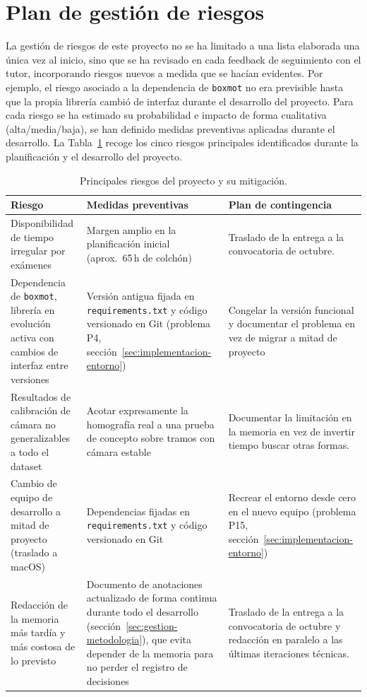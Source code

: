 \section{Plan de gestión de riesgos}
\label{sec:gestion-riesgos}

La gestión de riesgos de este proyecto no se ha limitado a una lista
elaborada una única vez al inicio, sino que se ha
revisado en cada feedback de seguimiento con el tutor, incorporando riesgos
nuevos a medida que se hacían evidentes. Por ejemplo, el riesgo asociado a
la dependencia de \texttt{boxmot} no era previsible hasta que la propia
librería cambió de interfaz durante el desarrollo del proyecto. Para
cada riesgo se ha estimado su probabilidad e impacto de forma cualitativa
(alta/media/baja), se han definido medidas preventivas aplicadas durante el
desarrollo. La Tabla~\ref{tab:gestion-riesgos-tabla} recoge los cinco
riesgos principales identificados durante la planificación y el
desarrollo del proyecto.

\begin{table}[htp]
\centering
\caption{Principales riesgos del proyecto y su mitigación.}
\label{tab:gestion-riesgos-tabla}
\renewcommand{\arraystretch}{1.3}
\begin{tabular}{|p{3.0cm}|p{4.5cm}|p{4.5cm}|}
\hline
\rowcolor{gray!25}
\textbf{Riesgo} & \textbf{Medidas preventivas} & \textbf{Plan de contingencia} \\
\hline
Disponibilidad de tiempo irregular por exámenes &
  Margen amplio en la planificación inicial (aprox.\ 65\,h de colchón) &
  Traslado de la entrega a la convocatoria de octubre. \\
\hline
Dependencia de \texttt{boxmot}, librería en evolución activa con cambios de
  interfaz entre versiones &
  Versión antigua fijada en \texttt{requirements.txt} y código
  versionado en Git (problema P4, sección~\ref{sec:implementacion-entorno}) &
  Congelar la versión funcional y documentar el problema en vez de migrar
  a mitad de proyecto \\
\hline
Resultados de calibración de cámara no generalizables a todo el dataset &
  Acotar expresamente la homografía real a una prueba de concepto sobre
  tramos con cámara estable &
  Documentar la limitación en la memoria en vez de invertir tiempo buscar otras formas. \\
\hline
Cambio de equipo de desarrollo a mitad de proyecto (traslado a macOS) &
  Dependencias fijadas en \texttt{requirements.txt} y código versionado
  en Git &
  Recrear el entorno desde cero en el nuevo equipo (problema P15,
  sección~\ref{sec:implementacion-entorno}) \\
\hline
Redacción de la memoria más tardía y más costosa de lo previsto &
  Documento de anotaciones actualizado de forma continua durante todo el
  desarrollo (sección~\ref{sec:gestion-metodologia}), que evita depender
  de la memoria para no perder el registro de decisiones &
  Traslado de la entrega a la convocatoria de octubre y redacción en
  paralelo a las últimas iteraciones técnicas. \\
\hline
\end{tabular}
\end{table}

